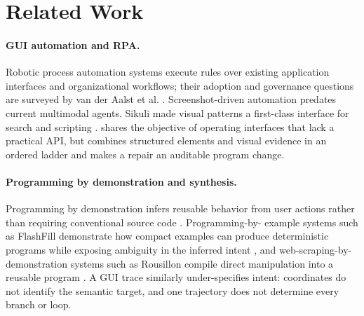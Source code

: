 \section{Related Work}

\paragraph{GUI automation and RPA.}
Robotic process automation systems execute rules over existing application
interfaces and organizational workflows; their adoption and governance
questions are surveyed by van der Aalst et al. \cite{vanderaalst2018rpa}.
Screenshot-driven automation predates current multimodal agents. Sikuli made
visual patterns a first-class interface for search and scripting
\cite{sikuli}. \system{} shares the objective of operating interfaces that lack
a practical API, but combines structured elements and visual evidence in an
ordered ladder and makes a repair an auditable program change.

\paragraph{Programming by demonstration and synthesis.}
Programming by demonstration infers reusable behavior from user actions rather
than requiring conventional source code \cite{cypher1993watch}. Programming-by-
example systems such as FlashFill demonstrate how compact examples can produce
deterministic programs while exposing ambiguity in the inferred intent
\cite{gulwani2011automating}, and web-scraping-by-demonstration systems such as
Rousillon compile direct manipulation into a reusable program
\cite{chasins2018rousillon}. A GUI trace similarly under-specifies intent:
coordinates do not identify the semantic target, and one trajectory does not
determine every branch or loop.

